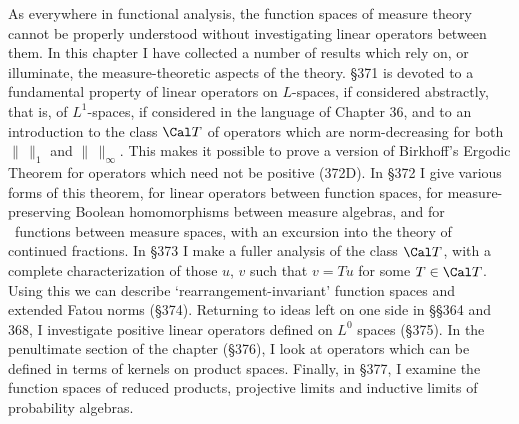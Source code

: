 
\def\chaptername{Linear operators between function spaces}
\def\sectionname{Introduction}


As everywhere in functional analysis, the function spaces of measure
theory cannot be properly understood without investigating linear
operators between them.   In this chapter I have collected a number of
results which rely on, or illuminate, the measure-theoretic aspects of
the theory.   \S371 is devoted to a fundamental property of linear
operators on $L$-spaces, if considered abstractly, that is, of
$L^1$-spaces, if considered in the language of Chapter 36, and to an
introduction to the class $\Cal T$ of operators which are
norm-decreasing for both $\|\,\|_1$ and $\|\,\|_{\infty}$.   This makes
it possible to prove a version of Birkhoff's Ergodic Theorem for
operators which need not be positive (372D).   In \S372 I give various
forms of this theorem, for linear operators between function spaces, for
measure-preserving Boolean homomorphisms between measure algebras, and
for \imp\ functions between measure spaces, with an excursion into the
theory of continued fractions.   In \S373 I make a fuller analysis of
the class $\Cal T$, with a complete characterization of those $u$, $v$
such that $v=Tu$ for some $T\in\Cal T$.   Using this we can describe 
`rearrangement-invariant' function spaces and extended Fatou norms
(\S374).   Returning to ideas left on one side in \S\S364 and 368, I
investigate positive linear operators defined on $L^0$ spaces (\S375).
In the penultimate section of the chapter (\S376), 
I look at operators which
can be defined in terms of kernels on product spaces.   Finally, in \S377,
I examine the function spaces of reduced products, projective limits
and inductive limits of probability algebras.

\discrpage

